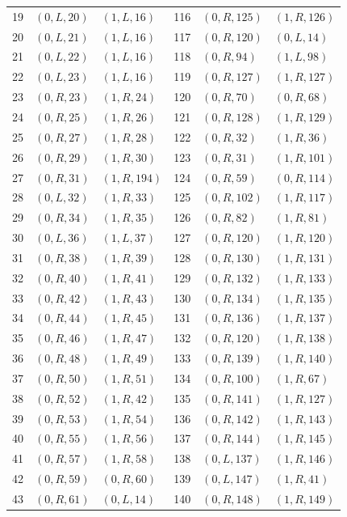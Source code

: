 \begin{longtable}{r@{\quad}ll@{\qquad}r@{\quad}ll}
19 & $(0,L,20)$ & $(1,L,16)$ & 116 & $(0,R,125)$ & $(1,R,126)$\\
20 & $(0,L,21)$ & $(1,L,16)$ & 117 & $(0,R,120)$ & $(0,L,14)$\\
21 & $(0,L,22)$ & $(1,L,16)$ & 118 & $(0,R,94)$ & $(1,L,98)$\\
22 & $(0,L,23)$ & $(1,L,16)$ & 119 & $(0,R,127)$ & $(1,R,127)$\\
23 & $(0,R,23)$ & $(1,R,24)$ & 120 & $(0,R,70)$ & $(0,R,68)$\\
24 & $(0,R,25)$ & $(1,R,26)$ & 121 & $(0,R,128)$ & $(1,R,129)$\\
25 & $(0,R,27)$ & $(1,R,28)$ & 122 & $(0,R,32)$ & $(1,R,36)$\\
26 & $(0,R,29)$ & $(1,R,30)$ & 123 & $(0,R,31)$ & $(1,R,101)$\\
27 & $(0,R,31)$ & $(1,R,194)$ & 124 & $(0,R,59)$ & $(0,R,114)$\\
28 & $(0,L,32)$ & $(1,R,33)$ & 125 & $(0,R,102)$ & $(1,R,117)$\\
29 & $(0,R,34)$ & $(1,R,35)$ & 126 & $(0,R,82)$ & $(1,R,81)$\\
30 & $(0,L,36)$ & $(1,L,37)$ & 127 & $(0,R,120)$ & $(1,R,120)$\\
31 & $(0,R,38)$ & $(1,R,39)$ & 128 & $(0,R,130)$ & $(1,R,131)$\\
32 & $(0,R,40)$ & $(1,R,41)$ & 129 & $(0,R,132)$ & $(1,R,133)$\\
33 & $(0,R,42)$ & $(1,R,43)$ & 130 & $(0,R,134)$ & $(1,R,135)$\\
34 & $(0,R,44)$ & $(1,R,45)$ & 131 & $(0,R,136)$ & $(1,R,137)$\\
35 & $(0,R,46)$ & $(1,R,47)$ & 132 & $(0,R,120)$ & $(1,R,138)$\\
36 & $(0,R,48)$ & $(1,R,49)$ & 133 & $(0,R,139)$ & $(1,R,140)$\\
37 & $(0,R,50)$ & $(1,R,51)$ & 134 & $(0,R,100)$ & $(1,R,67)$\\
38 & $(0,R,52)$ & $(1,R,42)$ & 135 & $(0,R,141)$ & $(1,R,127)$\\
39 & $(0,R,53)$ & $(1,R,54)$ & 136 & $(0,R,142)$ & $(1,R,143)$\\
40 & $(0,R,55)$ & $(1,R,56)$ & 137 & $(0,R,144)$ & $(1,R,145)$\\
41 & $(0,R,57)$ & $(1,R,58)$ & 138 & $(0,L,137)$ & $(1,R,146)$\\
42 & $(0,R,59)$ & $(0,R,60)$ & 139 & $(0,L,147)$ & $(1,R,41)$\\
43 & $(0,R,61)$ & $(0,L,14)$ & 140 & $(0,R,148)$ & $(1,R,149)$\\

\end{longtable}
